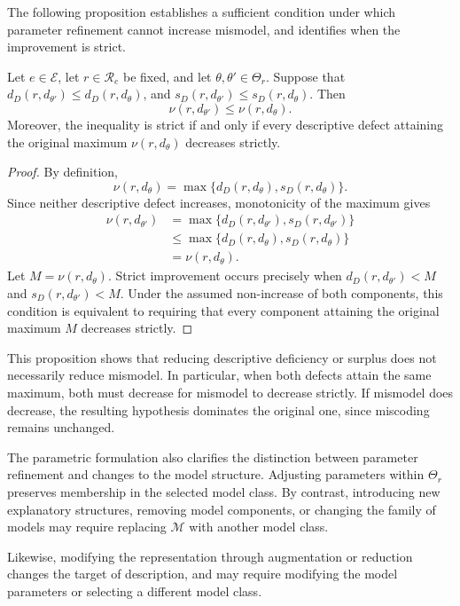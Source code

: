 The following proposition establishes a sufficient condition under which parameter refinement cannot increase mismodel, and identifies when the improvement is strict.

\begin{proposition}
Let $e\in\mathcal E$, let $r\in\mathcal R_e$ be fixed, and let $\theta,\theta'\in\Theta_r$. Suppose that $d_D(r,d_{\theta'}) \leq d_D(r,d_\theta)$, and $s_D(r,d_{\theta'}) \leq s_D(r,d_\theta)$. Then
\[
\nu(r,d_{\theta'}) \leq \nu(r,d_\theta).
\]
Moreover, the inequality is strict if and only if every descriptive defect attaining the original maximum $\nu(r,d_\theta)$ decreases strictly.
\end{proposition}
\begin{proof}
By definition,
\[
\nu(r,d_\theta) = \max\{d_D(r,d_\theta), s_D(r,d_\theta)\}.
\]
Since neither descriptive defect increases, monotonicity of the maximum gives
\[
\begin{aligned}
\nu(r,d_{\theta'})
&=
\max\{
d_D(r,d_{\theta'}),
s_D(r,d_{\theta'})
\}\\
&\leq
\max\{
d_D(r,d_\theta),
s_D(r,d_\theta)
\}\\
&=\nu(r,d_\theta).
\end{aligned}
\]
Let $M=\nu(r,d_\theta)$. Strict improvement occurs precisely when $d_D(r,d_{\theta'})<M$ and $s_D(r,d_{\theta'})<M$. Under the assumed non-increase of both components, this condition is equivalent to requiring that every component attaining the original maximum $M$ decreases strictly.
\end{proof}

This proposition shows that reducing descriptive deficiency or surplus does not necessarily reduce mismodel. In particular, when both defects attain the same maximum, both must decrease for mismodel to decrease strictly. If mismodel does decrease, the resulting hypothesis dominates the original one, since miscoding remains unchanged.

The parametric formulation also clarifies the distinction between parameter refinement and changes to the model structure. Adjusting parameters within $\Theta_r$ preserves membership in the selected model class. By contrast, introducing new explanatory structures, removing model components, or changing the family of models may require replacing $\mathcal M$ with another model class.

Likewise, modifying the representation through augmentation or reduction changes the target of description, and may require modifying the model parameters or selecting a different model class.

